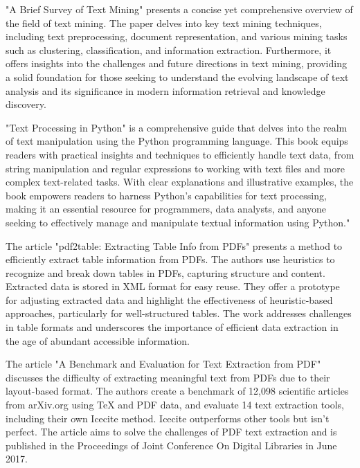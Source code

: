"A Brief Survey of Text Mining" \cite{Hotho:2005} presents a concise yet comprehensive overview of the field of text mining. The paper delves into key text mining techniques, including text preprocessing, document representation, and various mining tasks such as clustering, classification, and information extraction. Furthermore, it offers insights into the challenges and future directions in text mining, providing a solid foundation for those seeking to understand the evolving landscape of text analysis and its significance in modern information retrieval and knowledge discovery.

"Text Processing in Python" \cite{Mertz:2003} is a comprehensive guide that delves into the realm of text manipulation using the Python programming language. This book equips readers with practical insights and techniques to efficiently handle text data, from string manipulation and regular expressions to working with text files and more complex text-related tasks. With clear explanations and illustrative examples, the book empowers readers to harness Python's capabilities for text processing, making it an essential resource for programmers, data analysts, and anyone seeking to effectively manage and manipulate textual information using Python."

The article "pdf2table: Extracting Table Info from PDFs"  \cite{Yildiz:2005} presents a method to efficiently extract table information from PDFs. The authors use heuristics to recognize and break down tables in PDFs, capturing structure and content. Extracted data is stored in XML format for easy reuse. They offer a prototype for adjusting extracted data and highlight the effectiveness of heuristic-based approaches, particularly for well-structured tables. The work addresses challenges in table formats and underscores the importance of efficient data extraction in the age of abundant accessible information.

The article "A Benchmark and Evaluation for Text Extraction from PDF" \cite{Bast:2017} discusses the difficulty of extracting meaningful text from PDFs due to their layout-based format. The authors create a benchmark of 12,098 scientific articles from arXiv.org using TeX and PDF data, and evaluate 14 text extraction tools, including their own Icecite method. Icecite outperforms other tools but isn't perfect. The article aims to solve the challenges of PDF text extraction and is published in the Proceedings of Joint Conference On Digital Libraries in June 2017.

